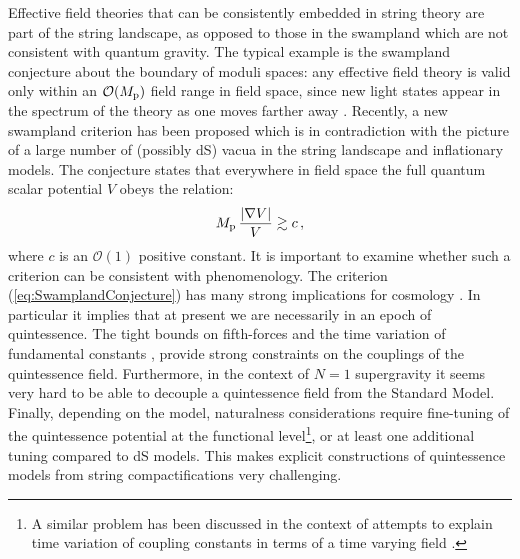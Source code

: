 \documentclass[11pt,a4paper]{article}
\newcommand{\be}{\begin{equation}}
\newcommand{\ee}{\end{equation}}
\newcommand{\mc}{\mathcal}
\begin{document}
Effective field theories that can be consistently embedded in string theory are part of the string landscape, as opposed  to  those in the swampland which are not consistent with quantum gravity. The typical example is the swampland conjecture about the boundary of moduli spaces:  any effective field theory is valid only within an $\mc{O}(M_{\rm p})$ field range in field space, since new light states appear in the spectrum of the theory as one moves farther away \cite{Ooguri:2006in}. Recently, a new swampland criterion has been proposed \cite{Obied:2018sgi} which is in contradiction with the picture of a large number of (possibly dS) vacua in the string landscape and inflationary models. The conjecture states that everywhere in field space the full quantum scalar potential $V$ obeys the relation:
\be
M_{\rm p}\,\frac{\left|\nabla V\right|}{V} \gtrsim c \,,
\label{eq:SwamplandConjecture}
\ee
where $c$ is an $\mc{O}(1)$ positive constant. It is important to examine whether such a criterion can be consistent with phenomenology. The criterion (\ref{eq:SwamplandConjecture}) has many strong implications for cosmology \cite{Agrawal:2018own, Andriot:2018wzk, Colgain:2018wgk}. In particular it implies that at present we are necessarily in an epoch of quintessence. The tight bounds on fifth-forces \cite{Adelberger:2003zx} and the time variation of fundamental constants \cite{Martins:2017yxk}, provide strong constraints on the couplings of the quintessence field. Furthermore, in the context of $N=1$ supergravity it seems very hard to be able to decouple a quintessence field from the Standard Model. Finally, depending on the model, naturalness considerations require fine-tuning of the quintessence potential at the functional level\footnote{A similar problem has been discussed in the context of attempts to explain time variation of coupling constants in terms of a time varying field \cite{Banks:2001qc}.}, or at least one additional tuning compared to dS models. This makes explicit constructions of quintessence models from string compactifications very challenging.
\end{document}
